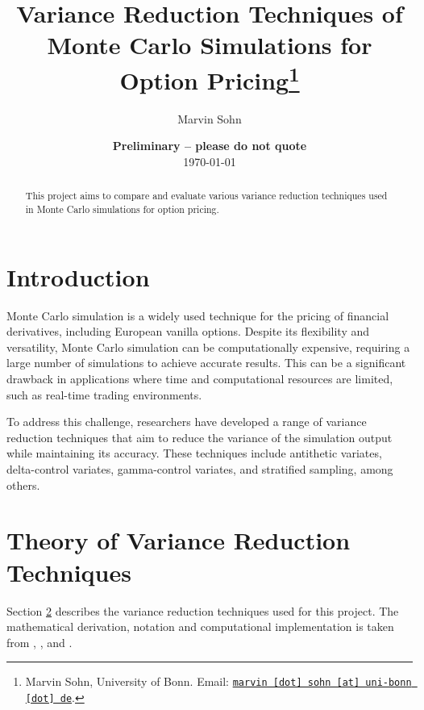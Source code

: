 \documentclass[11pt, a4paper, leqno]{article}
\begin{document}
\title{Variance Reduction Techniques of Monte Carlo Simulations for Option Pricing\thanks{Marvin Sohn, University of Bonn. Email: \href{mailto:marvin.sohn@uni-bonn.de}{\nolinkurl{marvin [dot] sohn [at] uni-bonn [dot] de}}.}}

\author{Marvin Sohn}

\date{
    {\bf Preliminary -- please do not quote}
    \\[1ex]
    \today
}

\maketitle


\begin{abstract}
    This project aims to compare and evaluate various variance reduction techniques used in Monte Carlo simulations for option pricing.
\end{abstract}

\clearpage


\section{Introduction} %
\label{sec:introduction}

Monte Carlo simulation is a widely used technique for the pricing of financial derivatives, including European vanilla options. Despite its flexibility and versatility, Monte Carlo simulation can be computationally expensive, requiring a large number of simulations to achieve accurate results. This can be a significant drawback in applications where time and computational resources are limited, such as real-time trading environments.

To address this challenge, researchers have developed a range of variance reduction techniques that aim to reduce the variance of the simulation output while maintaining its accuracy. These techniques include antithetic variates, delta-control variates, gamma-control variates, and stratified sampling, among others.

\section{Theory of Variance Reduction Techniques}\label{sec:var_reduc_techniques}

Section \ref{sec:var_reduc_techniques} describes the variance reduction techniques used for this project. The mathematical derivation, notation and computational implementation is taken from \cite{Glassermann:2004}, \cite{Hilpisch:2015}, and \cite{Clewlow:1998}.
\end{document}
